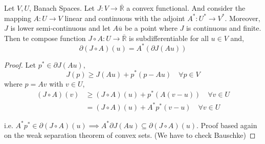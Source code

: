 \begin{theorem}
	Let $V, U$, Banach Spaces. Let $J:V \rightarrow \overline{\mathbb{R}}$ a convex functional. And consider the mapping $A: U\rightarrow V$ linear and continuous with the adjoint $A^*:U^*\rightarrow V^*$. Moreover, $J$ is lower semi-continuous and let $A\overline{u}$ be a point where $J$ is continuous and finite. Then te compose function $J\circ A: U\rightarrow \overline{\mathbb{R}}$ is subdifferentiable for all $u\in V$ and, 
	\[
		\partial(J\circ A)(u)=A^*\left(\partial J(Au)\right)
	\]
	\begin{proof}
		Let $p^*\in \partial J(Au)$,
		\[
			J(p)\geq J(Au)+p^*(p-Au) \quad \forall p \in V 
		\]
		where $p=Av$ with $v\in U$,
		\begin{align*}
			(J\circ A) (v) &\geq (J\circ A) (u)+p^*(A(v-u)) \quad \forall v \in U \\
						   &=(J\circ A)(u)+A^*p^*(v-u) \quad \forall v \in U
		\end{align*}
		
		i.e. $A^*p^* \in \partial (J\circ A)(u) \implies A^* \partial J(Au)\subseteq \partial (J\circ A)(u)$. Proof based again on the weak separation theorem of convex sets. (We have to check Bauschke)
	\end{proof}
\end{theorem}


